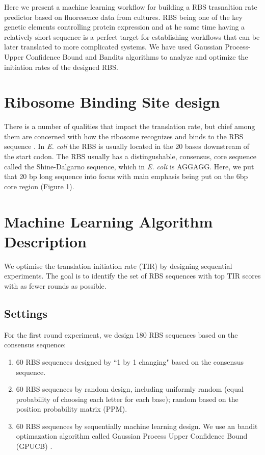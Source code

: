 \documentclass{article}
\begin{document}
Here we present a machine learning workflow for building a RBS trasnaltion rate predictor based on fluoresence data from cultures. RBS being one of the key genetic elements controlling protein expression and at he same time having a relatively short sequence is a perfect target for establishing workflows that can be later translated to more complicated systems. We have used Gaussian Process-Upper Confidence Bound and Bandits algorithms to analyze and optimize the initiation rates of the designed RBS.

\section{Ribosome Binding Site design}
There is a number of qualities that impact the translation rate, but chief among them are concerned with how the ribosome recognizes and binds to the RBS sequence \cite{Chen1994,Vellanoweth1992}. In \emph{E. coli} the RBS is usually located in the 20 bases downstream of the start codon. The RBS usually has a distingushable, consensus, core sequence called the Shine-Dalgarno sequence, which in \emph{E. coli} is AGGAGG. Here, we put that 20 bp long sequence into focus with main emphasis being put on the 6bp core region (Figure 1). \\




\section{Machine Learning Algorithm Description}

We optimise the translation initiation rate (TIR) by designing sequential experiments. The goal is to identify the set of RBS sequences with top TIR scores with as fewer rounds as possible. 

\subsection{Settings}

For the first round experiment, we design 180 RBS sequences based on the consensus sequence: 

\begin{enumerate}
    \item 60 RBS sequences designed by ``1 by 1 changing" based on the consensus sequence.
    \item 60 RBS sequences by random design, including uniformly random (equal probability of choosing each letter for each base); random based on the position probability matrix (PPM).
    \item 60 RBS sequences by sequentially machine learning design. We use an bandit optimazation algorithm called Gaussian Process Upper Confidence Bound (GPUCB) \cite{srinivas2012information}.   
\end{enumerate}{}
\end{document}
